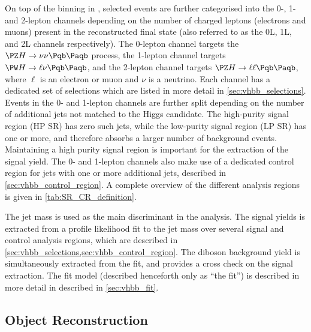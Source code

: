 On top of the binning in \ptv, selected events are further categorised into the 0-, 1- and 2-lepton channels depending on the number of charged leptons (electrons and muons) present in the reconstructed final state (also referred to as the 0L, 1L, and 2L channels respectively).
The 0-lepton channel targets the $\Zboson \higgs \rightarrow \nu\nu \bbbar$ process, the 1-lepton channel targets $\Wboson \higgs \rightarrow \ell\nu \bbbar$, and the 2-lepton channel targets $\Zboson \higgs \rightarrow \ell\ell \bbbar$, where $\ell$ is an electron or muon and $\nu$ is a neutrino.
Each channel has a dedicated set of selections which are listed in more detail in \cref{sec:vhbb_selections}.
Events in the 0- and 1-lepton channels are further split depending on the number of additional \smallR jets
not matched to the Higgs candidate.
The high-purity signal region (HP SR) has zero such jets, while the low-purity signal region (LP SR) has one or more, and therefore absorbs a larger number of background \ttbar events.
Maintaining a high purity signal region is important for the extraction of the signal yield.
The 0- and 1-lepton channels also make use of a dedicated \ttbar control region for jets with one or more additional \btagged \smallR jets, described in \cref{sec:vhbb_control_region}.
A complete overview of the different analysis regions is given in \cref{tab:SR_CR_definition}.

%

%

The \largeR jet mass is used as the main discriminant in the analysis.
The signal \VHbb yields is extracted from a profile likelihood fit to the \largeR jet mass over several signal and control analysis regions, which are described in \cref{sec:vhbb_selections,sec:vhbb_control_region}.
The diboson background \VZbb yield is simultaneously extracted from the fit, and provides a cross check on the signal extraction.
The fit model (described henceforth only as ``the fit'') is described in more detail in described in \cref{sec:vhbb_fit}.







\subsection{Object Reconstruction}\label{sec:vhbb_object_reco}

